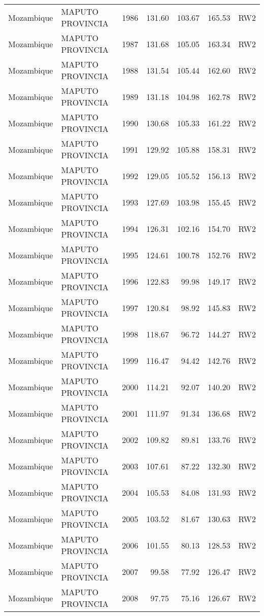 \begin{longtable}{lllrrrl}
  Mozambique & MAPUTO PROVINCIA & 1986 & 131.60 & 103.67 & 165.53 & RW2 \\ 
  Mozambique & MAPUTO PROVINCIA & 1987 & 131.68 & 105.05 & 163.34 & RW2 \\ 
  Mozambique & MAPUTO PROVINCIA & 1988 & 131.54 & 105.44 & 162.60 & RW2 \\ 
  Mozambique & MAPUTO PROVINCIA & 1989 & 131.18 & 104.98 & 162.78 & RW2 \\ 
  Mozambique & MAPUTO PROVINCIA & 1990 & 130.68 & 105.33 & 161.22 & RW2 \\ 
  Mozambique & MAPUTO PROVINCIA & 1991 & 129.92 & 105.88 & 158.31 & RW2 \\ 
  Mozambique & MAPUTO PROVINCIA & 1992 & 129.05 & 105.52 & 156.13 & RW2 \\ 
  Mozambique & MAPUTO PROVINCIA & 1993 & 127.69 & 103.98 & 155.45 & RW2 \\ 
  Mozambique & MAPUTO PROVINCIA & 1994 & 126.31 & 102.16 & 154.70 & RW2 \\ 
  Mozambique & MAPUTO PROVINCIA & 1995 & 124.61 & 100.78 & 152.76 & RW2 \\ 
  Mozambique & MAPUTO PROVINCIA & 1996 & 122.83 & 99.98 & 149.17 & RW2 \\ 
  Mozambique & MAPUTO PROVINCIA & 1997 & 120.84 & 98.92 & 145.83 & RW2 \\ 
  Mozambique & MAPUTO PROVINCIA & 1998 & 118.67 & 96.72 & 144.27 & RW2 \\ 
  Mozambique & MAPUTO PROVINCIA & 1999 & 116.47 & 94.42 & 142.76 & RW2 \\ 
  Mozambique & MAPUTO PROVINCIA & 2000 & 114.21 & 92.07 & 140.20 & RW2 \\ 
  Mozambique & MAPUTO PROVINCIA & 2001 & 111.97 & 91.34 & 136.68 & RW2 \\ 
  Mozambique & MAPUTO PROVINCIA & 2002 & 109.82 & 89.81 & 133.76 & RW2 \\ 
  Mozambique & MAPUTO PROVINCIA & 2003 & 107.61 & 87.22 & 132.30 & RW2 \\ 
  Mozambique & MAPUTO PROVINCIA & 2004 & 105.53 & 84.08 & 131.93 & RW2 \\ 
  Mozambique & MAPUTO PROVINCIA & 2005 & 103.52 & 81.67 & 130.63 & RW2 \\ 
  Mozambique & MAPUTO PROVINCIA & 2006 & 101.55 & 80.13 & 128.53 & RW2 \\ 
  Mozambique & MAPUTO PROVINCIA & 2007 & 99.58 & 77.92 & 126.47 & RW2 \\ 
  Mozambique & MAPUTO PROVINCIA & 2008 & 97.75 & 75.16 & 126.67 & RW2 \\ 

\end{longtable}
